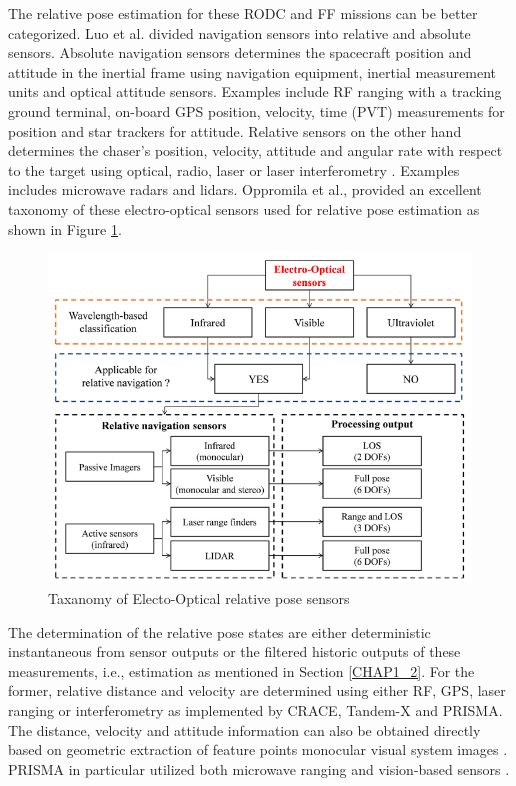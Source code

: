 The relative pose estimation for these RODC and FF missions can be better categorized. Luo et al. \cite{luoSurvey13} divided navigation sensors into relative and absolute sensors. Absolute navigation sensors determines the spacecraft position and attitude in the inertial frame using navigation equipment, inertial measurement units and optical attitude sensors. Examples include RF ranging with a tracking ground terminal, on-board GPS position, velocity, time (PVT) measurements for position and star trackers for attitude. Relative sensors on the other hand determines the chaser's position, velocity, attitude and angular rate with respect to the target using optical, radio, laser or laser interferometry \cite{yangInterSatelliteGrace13}. Examples includes microwave radars and lidars. 
Oppromila et al.\cite{OpromollaPose17}, provided an excellent taxonomy of these electro-optical sensors used for relative pose estimation as shown in Figure \ref{fig:taxonomyEo}. 
\begin{figure}[ht]
    \centering
    \includegraphics[width=1\textwidth]{Figures/OppromolaTaxanomyPoseSensors.PNG}
    \caption{Taxanomy of Electo-Optical relative pose sensors \cite{OpromollaPose17}}
    \label{fig:taxonomyEo}
\end{figure}
The determination of the relative pose states are either deterministic instantaneous from sensor outputs or the filtered historic outputs of these measurements, i.e., estimation as mentioned in Section \ref{CHAP1_2}. For the former, relative distance and velocity are determined using either RF, GPS, laser ranging or interferometry as implemented by CRACE, Tandem-X and PRISMA. The distance, velocity and attitude information can also be obtained directly based on geometric extraction of feature points monocular visual system images \cite{aghiliPoseVision10, leiPoseSlam19, sharmePoseNonC17a, ShijieMono10}. PRISMA in particular utilized both microwave ranging and vision-based sensors \cite{monterbruckPrismaIsr08}.

